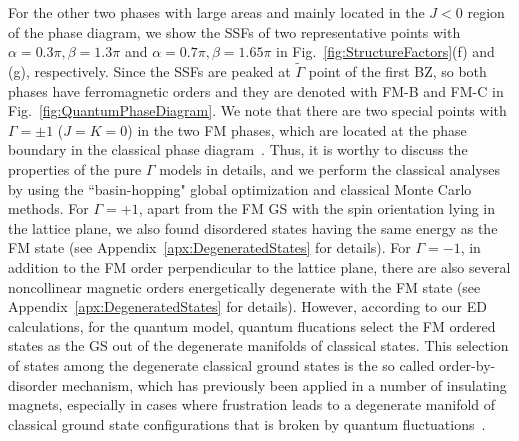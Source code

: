 \documentclass[aps,prb,reprint,amsfonts,amsmath,amssymb,showpacs,groupedaddress,superscriptaddress]{revtex4-1}
\begin{document}
For the other two phases with large areas and mainly located in the $J<0$ region of the phase diagram, we show the SSFs of two representative points with $\alpha=0.3\pi, \beta=1.3\pi$ and $\alpha=0.7\pi, \beta=1.65\pi$ in Fig.~\ref{fig:StructureFactors}(f) and (g), respectively. Since the SSFs are peaked at $\tilde{\Gamma}$ point of the first BZ, so both phases have ferromagnetic orders and they are denoted with FM-B and FM-C in Fig.~\ref{fig:QuantumPhaseDiagram}. We note that there are two special points with $\Gamma=\pm1$ ($J=K=0$) in the two FM phases, which are located at the phase boundary in the classical phase diagram~\cite{PhysRevB.92.165108}. Thus, it is worthy to discuss the properties of the pure $\Gamma$ models in details, and we perform the classical analyses by using the ``basin-hopping" global optimization and classical Monte Carlo methods. For $\Gamma=+1$, apart from the FM GS with the spin orientation lying in the lattice plane, we also found disordered states having the same energy as the FM state (see Appendix~\ref{apx:DegeneratedStates} for details). For $\Gamma=-1$, in addition to the FM order perpendicular to the lattice plane, there are also several noncollinear magnetic orders energetically degenerate with the FM state (see Appendix~\ref{apx:DegeneratedStates} for details). However, according to our ED calculations, for the quantum model, quantum flucations select the FM ordered states as the GS out of the degenerate manifolds of classical states. This selection of states among the degenerate classical ground states is the so called order-by-disorder mechanism, which has previously been applied in a number of insulating magnets, especially in cases where frustration leads to a degenerate manifold of classical ground state configurations that is broken by quantum fluctuations~\cite{JPSJ.54.4494,PhysRevLett.62.2056,PhysRevLett.88.067203,PhysRevB.81.214419,PhysRevLett.109.077204}.
\end{document}

